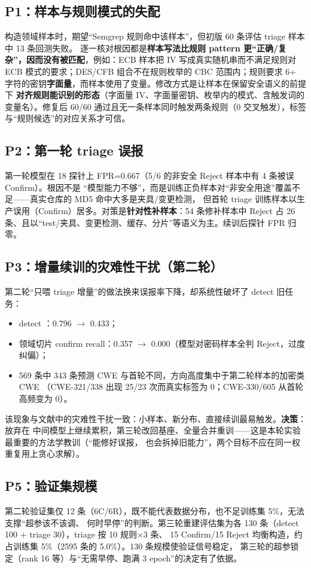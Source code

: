 \documentclass[11pt,a4paper,fontset=none]{ctexart}
\newcommand{\code}[1]{\begingroup\ttfamily\small\detokenize{#1}\endgroup}
\begin{document}
\subsection{P1：样本与规则模式的失配}
构造领域样本时，期望“Semgrep 规则命中该样本”，但初版 60 条评估 triage 样本中 13 条回测失败。
逐一核对根因都是\textbf{样本写法比规则 pattern 更“正确/复杂”，因而没有被匹配}，例如：ECB 样本把
IV 写成真实随机串而不满足规则对 ECB 模式的要求；DES/CFB 组合不在规则枚举的 CBC 范围内；规则要求
6+ 字符的密钥\textbf{字面量}，而样本使用了变量。修改方式是让样本在保留安全语义的前提下
\textbf{对齐规则能识别的形态}（字面量 IV、字面量密钥、枚举内的模式、含触发词的变量名）。修复后
60/60 通过且无一条样本同时触发两条规则（0 交叉触发），标签与“规则候选”的对应关系才可信。

\subsection{P2：第一轮 triage 误报}
第一轮模型在 18 探针上 FPR=0.667（5/6 的非安全 Reject 样本中有 4 条被误 Confirm）。根因不是
“模型能力不够”，而是训练正负样本对“非安全用途”覆盖不足——真实仓库的 MD5 命中大多是夹具/变更检测，
但首轮 triage 训练样本以生产误用（Confirm）居多。对策是\textbf{针对性补样本}：54 条修补样本中
Reject 占 26 条、且以“test/夹具、变更检测、缓存、分片”等语义为主。续训后探针 FPR 归零。

\subsection{P3：增量续训的灾难性干扰（第二轮）}
\label{sec:round2}
第二轮“只喂 triage 增量”的做法换来误报率下降，却系统性破坏了 detect 旧任务：
\begin{itemize}
  \item detect \code{cwe_acc}：0.796 $\to$ 0.433；
  \item 领域切片 confirm recall：0.357 $\to$ 0.000（模型对密码样本全判 Reject，过度纠偏）；
  \item 569 条中 343 条预测 CWE 与首轮不同，方向高度集中于第二轮样本的加密类 CWE
    （CWE-321/338 出现 25/23 次而真实标签为 0；CWE-330/605 从首轮高频变为 0）。
\end{itemize}
该现象与文献中的灾难性干扰一致：小样本、新分布、直接续训最易触发。\textbf{决策}：放弃在
中间模型上继续累积，第三轮改回基座、全量合并重训——这是本轮实验最重要的方法学教训（“能修好误报，
也会拆掉旧能力”，两个目标不应在同一权重复用上贪心求解）。

\subsection{P5：验证集规模}
第二轮验证集仅 12 条（6C/6R），既不能代表数据分布，也不足训练集 5\%，无法支撑“超参该不该调、
何时早停”的判断。第三轮重建评估集为各 130 条（detect 100 + triage 30），triage 按 10 规则×3 条、
15 Confirm/15 Reject 均衡构造，约占训练集 5\%（2595 条的 5.0\%）。130 条规模使验证信号稳定，
第三轮的超参锁定（rank 16 等）与“无需早停、跑满 3 epoch”的决定有了依据。
\end{document}
